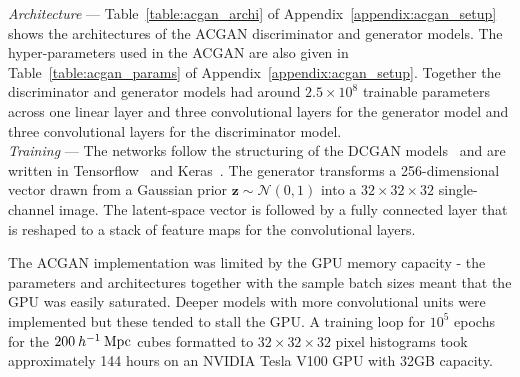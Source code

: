 \documentclass[twocolumn]{article}
\numberwithin{equation}{section}
\begin{document}


\textit{Architecture} --- 
Table~\ref{table:acgan_archi} of Appendix~\ref{appendix:acgan_setup} shows the architectures of the ACGAN discriminator 
and generator models. The hyper-parameters used in the ACGAN are also given in Table~\ref{table:acgan_params} of 
Appendix~\ref{appendix:acgan_setup}. Together the discriminator and generator models had around $2.5\times10^8$ trainable 
parameters across one linear layer and three convolutional layers for the generator model and three convolutional layers 
for the discriminator model. \\

{\setlength{\parindent}{0cm}
\textit{Training} --- 
The networks follow the structuring of the DCGAN models~\cite{dcgan} and are written in Tensorflow~\cite{tensorflow} and 
Keras~\cite{keras}. The generator transforms a 256-dimensional vector drawn from a Gaussian prior $\mathbf{z}\sim 
\mathcal{N}(0,1)$ into a $32 \times 32 \times 32$ single-channel image. The latent-space vector is followed by a fully 
connected layer that is reshaped to a stack of feature maps for the convolutional layers. 
}

The ACGAN implementation was limited by the GPU memory capacity - the parameters and architectures together with the 
sample batch sizes meant that the GPU was easily saturated. Deeper models with more convolutional units were implemented 
but these tended to stall the GPU. A training loop for $10^5$ epochs for the $200 \: h^{-1} \: \textup{Mpc}$ cubes 
formatted to $32 \times 32 \times 32$ pixel histograms took approximately 144 hours on an NVIDIA Tesla V100 GPU with 
32GB capacity. 
\end{document}
